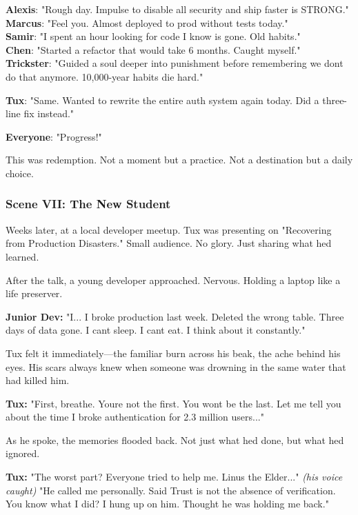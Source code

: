 \textbf{Alexis}: "Rough day. Impulse to disable all security and ship faster is STRONG."\\
\textbf{Marcus}: "Feel you. Almost deployed to prod without tests today."\\
\textbf{Samir}: "I spent an hour looking for code I know is gone. Old habits."\\
\textbf{Chen}: "Started a refactor that would take 6 months. Caught myself."\\
\textbf{Trickster}: "Guided a soul deeper into punishment before remembering we don\textquotesingle t do that anymore. 10,000-year habits die hard."

\textbf{Tux}: "Same. Wanted to rewrite the entire auth system again today. Did a three-line fix instead."

\textbf{Everyone}: "Progress!"

This was redemption. Not a moment but a practice. Not a destination but a daily choice.

\bookdivider

\subsubsection{Scene VII: The New Student}\label{scene-vii-the-new-student}

Weeks later, at a local developer meetup. Tux was presenting on "Recovering from Production Disasters." Small audience. No glory. Just sharing what he\textquotesingle d learned.

After the talk, a young developer approached. Nervous. Holding a laptop like a life preserver.

\textbf{Junior Dev:} "I... I broke production last week. Deleted the wrong table. Three days of data gone. I can\textquotesingle t sleep. I can\textquotesingle t eat. I think about it constantly."

Tux felt it immediately---the familiar burn across his beak, the ache behind his eyes. His scars always knew when someone was drowning in the same water that had killed him.

\textbf{Tux:} "First, breathe. You\textquotesingle re not the first. You won\textquotesingle t be the last. Let me tell you about the time I broke authentication for 2.3 million users..."

As he spoke, the memories flooded back. Not just what he\textquotesingle d done, but what he\textquotesingle d ignored.

\textbf{Tux:} "The worst part? Everyone tried to help me. Linus the Elder..." \emph{(his voice caught)} "He called me personally. Said \textquotesingle Trust is not the absence of verification.\textquotesingle{} You know what I did? I hung up on him. Thought he was holding me back."

